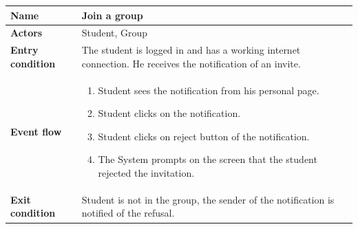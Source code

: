 \documentclass{article}
\begin{document}
\begin{enumerate}[label=\textbf{UC\arabic*}:]
        
        \begin{center}
        \begin{tabular}{ | m{8em} | m{10cm}|  } 
            \hline 
            \textbf{Name} & Join a group\\[1ex] 
            \hline 
            \textbf{Actors} & Student, Group\\[1ex] 
            \hline 
            \textbf{Entry condition} & The student is logged in and has a working internet connection. He receives the notification of an invite. \\[1ex] 
            \hline 
            \textbf{Event flow} & \begin{enumerate}[label=\textbf{\arabic*}:]
                \item Student sees the notification from his personal page.
                \item Student clicks on the notification.
                \item Student clicks on reject button of the notification.
                \item The System prompts on the screen that the student rejected the invitation. 
            \end{enumerate} \\[1ex]
            \hline 
            \textbf{Exit condition} & Student is not in the group, the sender of the notification is notified of the refusal.\\[1ex]
            \hline
        \end{tabular}
        \end{center}



\end{enumerate}
\end{document}
